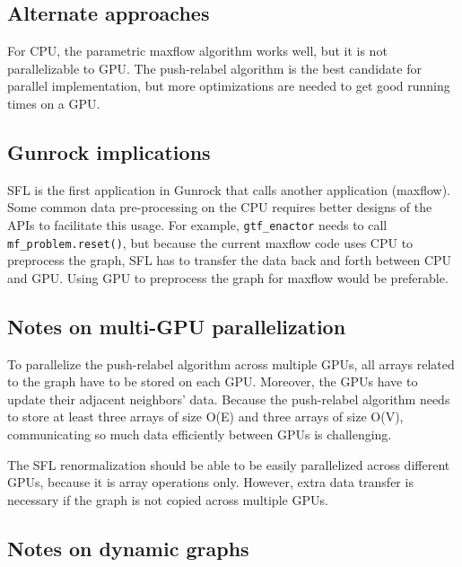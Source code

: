 \documentclass[10pt,oneside]{memoir}
\begin{document}
\hypertarget{alternate-approaches-7}{%
\subsection{Alternate approaches}\label{alternate-approaches-7}}

For CPU, the parametric maxflow algorithm works well, but it is not
parallelizable to GPU. The push-relabel algorithm is the best candidate
for parallel implementation, but more optimizations are needed to get
good running times on a GPU.

\hypertarget{gunrock-implications-7}{%
\subsection{Gunrock implications}\label{gunrock-implications-7}}

SFL is the first application in Gunrock that calls another application
(maxflow). Some common data pre-processing on the CPU requires better
designs of the APIs to facilitate this usage. For example,
\texttt{gtf\_enactor} needs to call \texttt{mf\_problem.reset()}, but
because the current maxflow code uses CPU to preprocess the graph, SFL
has to transfer the data back and forth between CPU and GPU. Using GPU
to preprocess the graph for maxflow would be preferable.

\hypertarget{notes-on-multi-gpu-parallelization-8}{%
\subsection{Notes on multi-GPU
parallelization}\label{notes-on-multi-gpu-parallelization-8}}

To parallelize the push-relabel algorithm across multiple GPUs, all
arrays related to the graph have to be stored on each GPU. Moreover, the
GPUs have to update their adjacent neighbors' data. Because the
push-relabel algorithm needs to store at least three arrays of size
O(\textbar{}E\textbar{}) and three arrays of size
O(\textbar{}V\textbar{}), communicating so much data efficiently between
GPUs is challenging.

The SFL renormalization should be able to be easily parallelized across
different GPUs, because it is array operations only. However, extra data
transfer is necessary if the graph is not copied across multiple GPUs.

\hypertarget{notes-on-dynamic-graphs-8}{%
\subsection{Notes on dynamic graphs}\label{notes-on-dynamic-graphs-8}}
\end{document}
